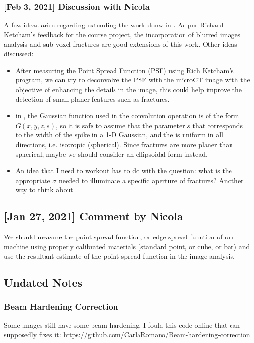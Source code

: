 \documentclass[11pt,titlepage]{article}
\begin{document}
\subsubsection{[Feb 3, 2021] Discussion with Nicola}
A few ideas arise regarding extending the work donw in \cite{Voorn2013}. As per Richard Ketcham's feedback for the course project, the incorporation of blurred images analysis and sub-voxel fractures are good extensions of this work. Other ideas discussed:
\begin{itemize}
	\item After measuring the Point Spread Function (PSF) using Rich Ketcham's program, we can try to deconvolve the PSF with the microCT image with the objective of enhancing the details in the image, this could help improve the detection of small planer features such as fractures. 
	\item in \cite{Voorn2013}, the Gaussian function used in the convolution operation is of the form $ G(x,y,z,s)$, so it is safe to assume that the parameter $s$ that corresponds to the width of the spike in a 1-D Gaussian, and the  is uniform in all directions, i.e. isotropic (spherical). Since fractures are more planer than spherical, maybe we should consider an ellipsoidal form instead. 
	\item An idea that I need to workout has to do with the question: what is the appropriate $\sigma$  needed to illuminate a specific aperture of fractures? Another way to think about
\end{itemize} 

\subsection{[Jan 27, 2021] Comment by Nicola}
We should measure the point spread function, or edge spread function of our machine using properly calibrated materials (standard point, or cube, or bar) and use the resultant estimate of the point spread function in the image analysis. 

\subsection{Undated Notes}
\subsubsection{Beam Hardening Correction}
Some images still have some beam hardening, I fould this code online that can supposedly fixes it: https://github.com/CarlaRomano/Beam-hardening-correction
\end{document}
